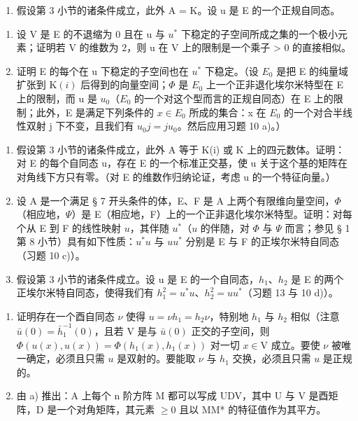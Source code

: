 \begin{enumerate}
\def\labelenumi{\arabic{enumi})}
\setcounter{enumi}{10}
\tightlist
\item
  假设第 3 小节的诸条件成立，此外 A = K。设 u 是 E 的一个正规自同态。
\end{enumerate}

\begin{enumerate}
\def\labelenumi{\alph{enumi})}
\item
  设 V 是 E 的不退缩为 0 且在 u 与 \(u^{*}\) 下稳定的子空间所成之集的一个极小元素；证明若 V 的维数为 2，则 u 在 V 上的限制是一个乘子 \textgreater{} 0 的直接相似。
\item
  证明 E 的每个在 u 下稳定的子空间也在 \(u^{*}\) 下稳定。（设 \(E_{0}\) 是把 E 的纯量域扩张到 \(\mathrm{K}(i)\) 后得到的向量空间；\(\Phi\) 是 \(E_{0}\) 上一个正非退化埃尔米特型在 E 上的限制，而 u 是 \(u_{0}\)（\(E_{0}\) 的一个对这个型而言的正规自同态）在 E 上的限制；此外，E 是满足下列条件的 \(x \in E_{0}\) 所成的集合：x 在 \(E_{0}\) 的一个对合半线性双射 j 下不变，且我们有 \(u_{0}j = ju_{0}\)。然后应用习题 10 a)。）
\end{enumerate}

\begin{enumerate}
\def\labelenumi{\arabic{enumi})}
\setcounter{enumi}{11}
\item
  假设第 3 小节的诸条件成立，此外 A 等于 K(i) 或 K 上的四元数体。证明：对 E 的每个自同态 u，存在 E 的一个标准正交基，使 u 关于这个基的矩阵在对角线下方只有零。（对 E 的维数作归纳论证，考虑 u 的一个特征向量。）
\item
  设 A 是一个满足 § 7 开头条件的体，E、F 是 A 上两个有限维向量空间，\(\Phi\)（相应地，\(\Psi\)）是 E（相应地，F）上的一个正非退化埃尔米特型。证明：对每个从 E 到 F 的线性映射 \(u\)，其伴随 \(u^{*}\)（\(u\) 的伴随，对 \(\Phi\) 与 \(\Psi\) 而言；参见 § 1 第 8 小节）具有如下性质：\(u^{*}u\) 与 \(uu^{*}\) 分别是 E 与 F 的正埃尔米特自同态（习题 10 c)）。
\item
  假设第 3 小节的诸条件成立。设 u 是 E 的一个自同态，\(h_{1}\)、\(h_{2}\) 是 E 的两个正埃尔米特自同态，使得我们有 \(h_{1}^{2}=u^{*}u\)、\(h_{2}^{2}=uu^{*}\)（习题 13 与 10 d)）。
\end{enumerate}

\begin{enumerate}
\def\labelenumi{\alph{enumi})}
\item
  证明存在一个酉自同态 \(\nu\) 使得 \(u = \nu h_{1} = h_{2}\nu\)，特别地 \(h_{1}\) 与 \(h_{2}\) 相似（注意 \(\bar{u}(0) = \bar{h}_{1}^{-1}(0)\)，且若 V 是与 \(\bar{u}(0)\) 正交的子空间，则 \(\Phi(u(x), u(x)) = \Phi(h_{1}(x), h_{1}(x))\) 对一切 \(x \in \mathrm{V}\) 成立。要使 \(\nu\) 被唯一确定，必须且只需 \(u\) 是双射的。要能取 \(\nu\) 与 \(h_{1}\) 交换，必须且只需 \(u\) 是正规的。
\item
  由 a) 推出：A 上每个 n 阶方阵 M 都可以写成 UDV，其中 U 与 V 是酉矩阵，D 是一个对角矩阵，其元素 \(\geqslant 0\) 且以 MM* 的特征值作为其平方。
\end{enumerate}

